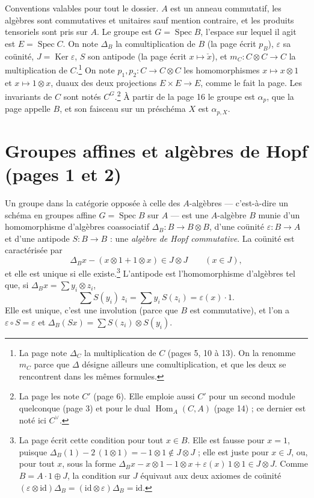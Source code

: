 \documentclass[11pt,a4paper]{article}
\begin{document}
Conventions valables pour tout le dossier. $A$ est un anneau commutatif, les
algèbres sont commutatives et unitaires sauf mention contraire, et les produits
tensoriels sont pris sur $A$. Le groupe est $G = \operatorname{Spec} B$,
l'espace sur lequel il agit est $E = \operatorname{Spec} C$. On note
$\Delta_B$ la comultiplication de $B$ (la page écrit $p_B$), $\varepsilon$ sa
coünité, $J = \operatorname{Ker}\varepsilon$, $S$ son antipode (la page écrit
$x \mapsto \check{x}$), et $m_C \colon C \otimes C \to C$ la multiplication
de $C$.\footnote{La page note $\Delta_C$ la multiplication de $C$ (pages 5,
10 à 13). On la renomme $m_C$ parce que $\Delta$ désigne ailleurs une
comultiplication, et que les deux se rencontrent dans les mêmes formules.}
On note $p_1, p_2 \colon C \to C \otimes C$ les homomorphismes
$x \mapsto x \otimes 1$ et $x \mapsto 1 \otimes x$, duaux des deux projections
$E \times E \to E$, comme le fait la page. Les invariants de $C$ sont notés
$C^G$.\footnote{La page les note $C'$ (page 6). Elle emploie aussi $C'$ pour
un second module quelconque (page 3) et pour le dual $\operatorname{Hom}_A(C,
A)$ (page 14) ; ce dernier est noté ici $C^{\vee}$.} À partir de la page 16
le groupe est $\alpha_p$, que la page appelle $B$, et son faisceau sur un
préschéma $X$ est $\alpha_{p,X}$.

\section*{Groupes affines et algèbres de Hopf (pages 1 et 2)}

Un groupe dans la catégorie opposée à celle des $A$-algèbres --- c'est-à-dire
un schéma en groupes affine $G = \operatorname{Spec} B$ sur $A$ --- est une
$A$-algèbre $B$ munie d'un homomorphisme d'algèbres coassociatif
$\Delta_B \colon B \to B \otimes B$, d'une coünité
$\varepsilon \colon B \to A$ et d'une antipode $S \colon B \to B$ : une
\emph{algèbre de Hopf commutative}. La coünité est caractérisée par
\[
\Delta_B x - (x \otimes 1 + 1 \otimes x) \in J \otimes J
\qquad (x \in J),
\]
et elle est unique si elle existe.\footnote{La page écrit cette condition pour
tout $x \in B$. Elle est fausse pour $x = 1$, puisque
$\Delta_B(1) - 2\,(1 \otimes 1) = -\,1 \otimes 1 \notin J \otimes J$ ; elle
est juste pour $x \in J$, ou, pour tout $x$, sous la forme
$\Delta_B x - x \otimes 1 - 1 \otimes x + \varepsilon(x)\, 1 \otimes 1 \in J
\otimes J$. Comme $B = A \cdot 1 \oplus J$, la condition sur $J$ équivaut aux
deux axiomes de coünité $(\varepsilon \otimes \mathrm{id})\Delta_B =
(\mathrm{id} \otimes \varepsilon)\Delta_B = \mathrm{id}$.} L'antipode est
l'homomorphisme d'algèbres tel que, si $\Delta_B x = \sum y_i \otimes z_i$,
\[
\sum S(y_i)\, z_i = \sum y_i\, S(z_i) = \varepsilon(x)\cdot 1 .
\]
Elle est unique, c'est une involution (parce que $B$ est commutative), et
l'on a $\varepsilon \circ S = \varepsilon$ et
$\Delta_B (S x) = \sum S(z_i) \otimes S(y_i)$.
\end{document}
